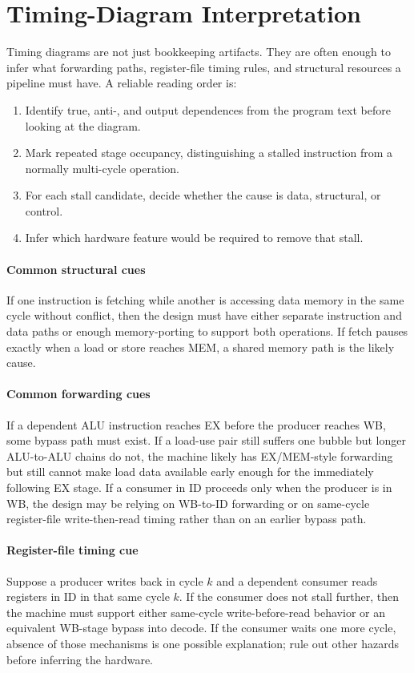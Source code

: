 \section{Timing-Diagram Interpretation}\label{sec:auto-044}
Timing diagrams are not just bookkeeping artifacts.
They are often enough to infer what forwarding paths, register-file timing rules, and structural resources a pipeline must have.
A reliable reading order is:
\begin{enumerate}
    \item Identify true, anti-, and output dependences from the program text before looking at the diagram.
    \item Mark repeated stage occupancy, distinguishing a stalled instruction from a normally multi-cycle operation.
    \item For each stall candidate, decide whether the cause is data, structural, or control.
    \item Infer which hardware feature would be required to remove that stall.
\end{enumerate}

\paragraph{Common structural cues}\label{par:auto-025a}
If one instruction is fetching while another is accessing data memory in the same cycle without conflict, then the design must have either separate instruction and data paths or enough memory-porting to support both operations.
If fetch pauses exactly when a load or store reaches MEM, a shared memory path is the likely cause.

\paragraph{Common forwarding cues}\label{par:auto-025b}
If a dependent ALU instruction reaches EX before the producer reaches WB, some bypass path must exist.
If a load-use pair still suffers one bubble but longer ALU-to-ALU chains do not, the machine likely has EX/MEM-style forwarding but still cannot make load data available early enough for the immediately following EX stage.
If a consumer in ID proceeds only when the producer is in WB, the design may be relying on WB-to-ID forwarding or on same-cycle register-file write-then-read timing rather than on an earlier bypass path.

\paragraph{Register-file timing cue}\label{par:auto-025c}
Suppose a producer writes back in cycle $k$ and a dependent consumer reads registers in ID in that same cycle $k$.
If the consumer does not stall further, then the machine must support either same-cycle write-before-read behavior or an equivalent WB-stage bypass into decode.
If the consumer waits one more cycle, absence of those mechanisms is one possible explanation; rule out other hazards before inferring the hardware.

